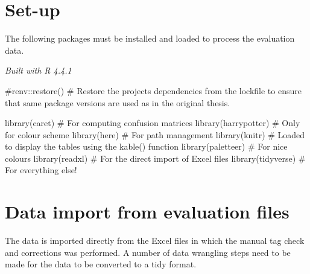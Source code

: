 \documentclass[
  letterpaper,
  DIV=11,
  numbers=noendperiod]{scrreprt}
\newenvironment{Shaded}{\begin{snugshade}}{\end{snugshade}}
\newcommand{\CommentTok}[1]{\textcolor[rgb]{0.37,0.37,0.37}{#1}}
\newcommand{\FunctionTok}[1]{\textcolor[rgb]{0.28,0.35,0.67}{#1}}
\newcommand{\NormalTok}[1]{\textcolor[rgb]{0.00,0.23,0.31}{#1}}
\begin{document}
\section{Set-up}\label{set-up}

The following packages must be installed and loaded to process the
evaluation data.

\emph{Built with R 4.4.1}

\begin{Shaded}
\begin{Highlighting}[]
\CommentTok{\#renv::restore() \# Restore the project\textquotesingle{}s dependencies from the lockfile to ensure that same package versions are used as in the original thesis.}

\FunctionTok{library}\NormalTok{(caret) }\CommentTok{\# For computing confusion matrices}
\FunctionTok{library}\NormalTok{(harrypotter) }\CommentTok{\# Only for colour scheme}
\FunctionTok{library}\NormalTok{(here) }\CommentTok{\# For path management}
\FunctionTok{library}\NormalTok{(knitr) }\CommentTok{\# Loaded to display the tables using the kable() function}
\FunctionTok{library}\NormalTok{(paletteer) }\CommentTok{\# For nice colours}
\FunctionTok{library}\NormalTok{(readxl) }\CommentTok{\# For the direct import of Excel files}
\FunctionTok{library}\NormalTok{(tidyverse) }\CommentTok{\# For everything else!}
\end{Highlighting}
\end{Shaded}

\section{Data import from evaluation
files}\label{data-import-from-evaluation-files}

The data is imported directly from the Excel files in which the manual
tag check and corrections was performed. A number of data wrangling
steps need to be made for the data to be converted to a tidy format.
\end{document}
